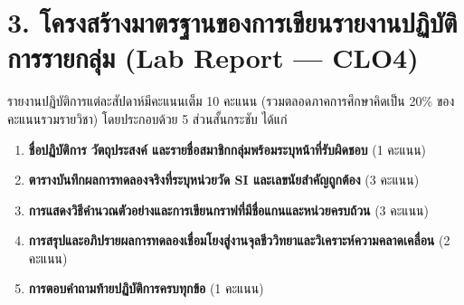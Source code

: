 \section*{3. โครงสร้างมาตรฐานของการเขียนรายงานปฏิบัติการรายกลุ่ม (Lab Report — CLO4)}
รายงานปฏิบัติการแต่ละสัปดาห์มีคะแนนเต็ม 10 คะแนน (รวมตลอดภาคการศึกษาคิดเป็น 20\% ของคะแนนรวมรายวิชา) โดยประกอบด้วย 5 ส่วนสั้นกระชับ ได้แก่
\begin{enumerate}
    \item \textbf{ชื่อปฏิบัติการ วัตถุประสงค์ และรายชื่อสมาชิกกลุ่มพร้อมระบุหน้าที่รับผิดชอบ} (1 คะแนน)
    \item \textbf{ตารางบันทึกผลการทดลองจริงที่ระบุหน่วยวัด SI และเลขนัยสำคัญถูกต้อง} (3 คะแนน)
    \item \textbf{การแสดงวิธีคำนวณตัวอย่างและการเขียนกราฟที่มีชื่อแกนและหน่วยครบถ้วน} (3 คะแนน)
    \item \textbf{การสรุปและอภิปรายผลการทดลองเชื่อมโยงสู่งานจุลชีววิทยาและวิเคราะห์ความคลาดเคลื่อน} (2 คะแนน)
    \item \textbf{การตอบคำถามท้ายปฏิบัติการครบทุกข้อ} (1 คะแนน)
\end{enumerate}
